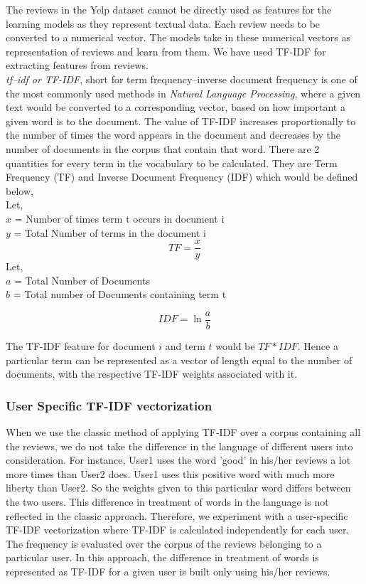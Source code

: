 \documentclass[letterpaper, 10 pt, conference]{ieeeconf}  %
\begin{document}
The reviews in the Yelp dataset cannot be directly used as features for the learning models as they represent textual data. Each review needs to be converted to a numerical vector. The models take in these numerical vectors as representation of reviews and learn from them. We have used TF-IDF for extracting features from reviews.
\\

\textit{tf–idf or TF-IDF}, short for term frequency–inverse document frequency is one of the most commonly used methods in \textit{Natural Language Processing}, where a given text would be converted to a corresponding vector, based on how important a given word is to the document. The value of TF-IDF increases proportionally to the number of times the word appears in the document and decreases by the number of documents in the corpus that contain that word. There are 2 quantities for every term in the vocabulary to be calculated. They are Term Frequency (TF) and Inverse Document Frequency (IDF) which would be defined below,\\

\noindent Let, \\
$x$ = Number of times term t occurs in document i\\
$y$ = Total Number of terms in the document i
\begin{equation}
TF = \frac{x}{y}
\end{equation}
Let, \\
$a$ = Total Number of Documents \\
$b$ = Total number of Documents containing term t

\begin{equation}
IDF = \ln{\frac{a}{b}}
\end{equation}

The TF-IDF feature for document $i$ and term $t$ would be $TF*IDF$. Hence a particular term can be represented as a vector of length equal to the number of documents, with the respective TF-IDF weights associated with it.\\


\subsubsection{User Specific TF-IDF vectorization}

When we use the classic method of applying TF-IDF over a corpus containing all the reviews, we do not take the difference in the language of different users into consideration. For instance, User1 uses the word 'good' in his/her reviews a lot more times than User2 does. User1 uses this positive word with much more liberty than User2. So the weights given to this particular word differs between the two users. This difference in treatment of words in the language is not reflected in the classic approach. Therefore, we experiment with a user-specific TF-IDF vectorization where TF-IDF is calculated independently for each user. The frequency is evaluated over the corpus of the reviews belonging to a particular user. In this approach, the difference in treatment of words is represented as TF-IDF for a given user is built only using his/her reviews. 
\end{document}
